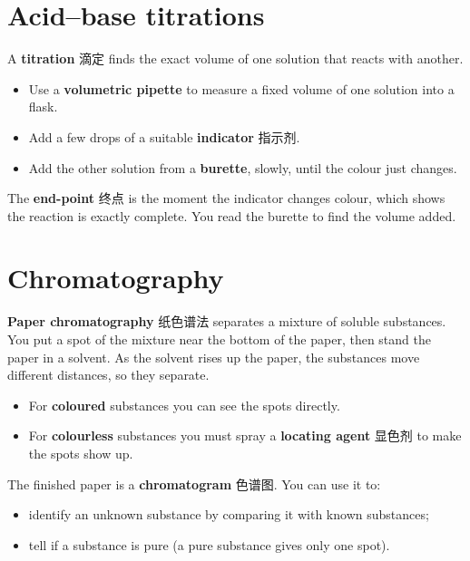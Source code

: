 \documentclass[11pt]{article}
\begin{document}
\section*{Acid–base titrations}

A \textbf{titration} 滴定 finds the exact volume of one solution that reacts with another.

\begin{itemize}
\item Use a \textbf{volumetric pipette} to measure a fixed volume of one solution into a flask.

\item Add a few drops of a suitable \textbf{indicator} 指示剂.

\item Add the other solution from a \textbf{burette}, slowly, until the colour just changes.

\end{itemize}

The \textbf{end-point} 终点 is the moment the indicator changes colour, which shows the reaction is exactly complete. You read the burette to find the volume added.

\section*{Chromatography}

\textbf{Paper chromatography} 纸色谱法 separates a mixture of soluble substances. You put a spot of the mixture near the bottom of the paper, then stand the paper in a solvent. As the solvent rises up the paper, the substances move different distances, so they separate.

\begin{itemize}
\item For \textbf{coloured} substances you can see the spots directly.

\item For \textbf{colourless} substances you must spray a \textbf{locating agent} 显色剂 to make the spots show up.

\end{itemize}

The finished paper is a \textbf{chromatogram} 色谱图. You can use it to:

\begin{itemize}
\item identify an unknown substance by comparing it with known substances;

\item tell if a substance is pure (a pure substance gives only one spot).

\end{itemize}
\end{document}
